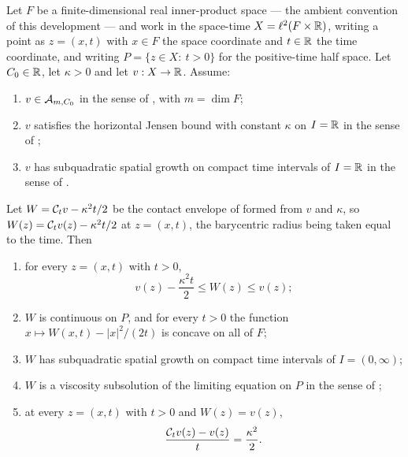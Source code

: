 \begin{lemma}
Let $F$ be a finite-dimensional real inner-product space --- the ambient
convention of this development --- and work in the space-time
$X=\ell^2(F\times\mathbb{R})$, writing a point as $z=(x,t)$ with $x\in F$ the space
coordinate and $t\in\mathbb{R}$ the time coordinate, and writing
$P=\{z\in X:\ t>0\}$ for the positive-time half space. Let $C_0\in\mathbb{R}$, let
$\kappa>0$ and let $v:X\to\mathbb{R}$. Assume:
\begin{enumerate}
\item\label{it:cep-class} $v\in\mathcal{A}_{m,C_0}$ in the sense of
, with $m=\dim F$;
\item\label{it:cep-jensen} $v$ satisfies the horizontal Jensen bound with
constant $\kappa$ on $I=\mathbb{R}$ in the sense of ;
\item\label{it:cep-grow} $v$ has subquadratic spatial growth on compact time
intervals of $I=\mathbb{R}$ in the sense of .
\end{enumerate}
Let $W=\mathcal{C}_tv-\kappa^2t/2$ be the contact envelope of 
formed from $v$ and $\kappa$, so $W(z)=\mathcal{C}_tv(z)-\kappa^2t/2$ at $z=(x,t)$,
the barycentric radius being taken equal to the time. Then
\begin{enumerate}
\item[(a)] for every $z=(x,t)$ with $t>0$,
\[
  v(z)-\frac{\kappa^2t}{2}\le W(z)\le v(z);
\]
\item[(b)] $W$ is continuous on $P$, and for every $t>0$ the function
$x\mapsto W(x,t)-|x|^2/(2t)$ is concave on all of $F$;
\item[(c)] $W$ has subquadratic spatial growth on compact time intervals of
$I=(0,\infty)$;
\item[(d)] $W$ is a viscosity subsolution of the limiting equation on $P$ in
the sense of ;
\item[(e)] at every $z=(x,t)$ with $t>0$ and $W(z)=v(z)$,
\[
  \frac{\mathcal{C}_tv(z)-v(z)}{t}=\frac{\kappa^2}{2}.
\]
\end{enumerate}
\end{lemma}
